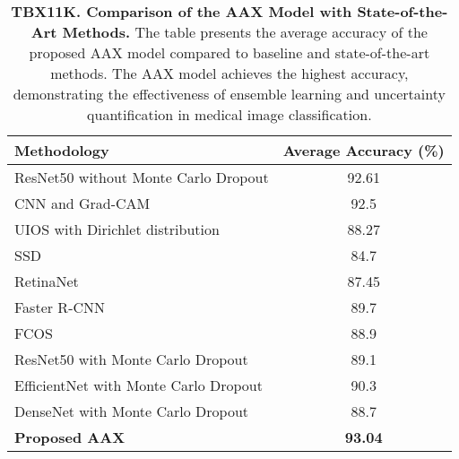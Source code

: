
\begin{table}[!h]
\centering
\caption{\textbf{TBX11K. Comparison of the AAX Model with State-of-the-Art Methods.}
The table presents the average accuracy of the proposed AAX model compared to baseline and state-of-the-art methods. The AAX model achieves the highest accuracy, demonstrating the effectiveness of ensemble learning and uncertainty quantification in medical image classification.}
\label{tab:model_accuracy_tbx}
\begin{tabular}{@{}lc@{}}
\toprule
\textbf{Methodology} & \textbf{Average Accuracy (\%)} \\ \midrule
ResNet50 without Monte Carlo Dropout \cite{ref49} & 92.61 \\
CNN and Grad-CAM \cite{ref50} & 92.5 \\
UIOS with Dirichlet distribution \cite{ref38} & 88.27 \\
SSD \cite{ref51} & 84.7 \\
RetinaNet \cite{ref52} & 87.45 \\
Faster R-CNN \cite{ref53} & 89.7 \\
FCOS \cite{ref54} & 88.9 \\
ResNet50 with Monte Carlo Dropout & 89.1 \\
EfficientNet with Monte Carlo Dropout & 90.3 \\
DenseNet with Monte Carlo Dropout & 88.7 \\
\textbf{Proposed AAX} & \textbf{93.04} \\ \bottomrule
\end{tabular}
\end{table}